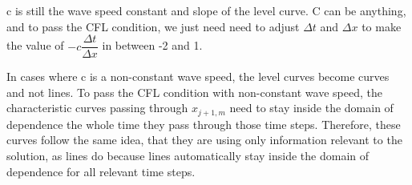 \documentclass{article}
\begin{document}
c is still the wave speed constant and slope of the level curve. C can be anything, and to pass the CFL condition, we just need need to adjust $\Delta t$ and $\Delta x$ to make the value of $-c\dfrac{\Delta t}{\Delta x}$ in between -2 and 1.
\newline

In cases where c is a non-constant wave speed, the level curves become curves and not lines. To pass the CFL condition with non-constant wave speed, the characteristic curves passing through $x_{j+1,m}$ need to stay inside the domain of dependence the whole time they pass through those time steps. Therefore, these curves follow the same idea, that they are using only information relevant to the solution, as lines do because lines automatically stay inside the domain of dependence for all relevant time steps.
\end{document}
